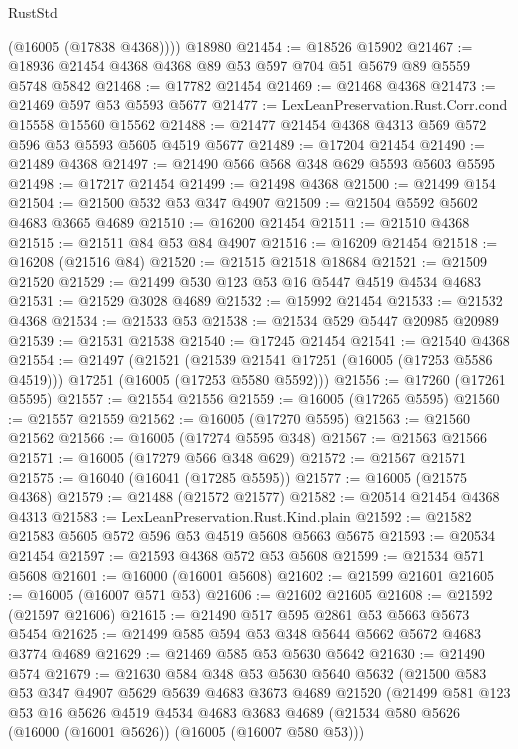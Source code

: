 \begin{lexlean}{RustStd}
\begin{coremodule}
        (@16005 (@17838 @4368))))
    @18980
@21454 := @18526 @15902
@21467 := @18936 @21454 @4368 @4368 @89 @53 @597 @704 @51 @5679 @89 @5559 @5748 @5842
@21468 := @17782 @21454
@21469 := @21468 @4368
@21473 := @21469 @597 @53 @5593 @5677
@21477 := LexLeanPreservation.Rust.Corr.cond @15558 @15560 @15562
@21488 := @21477 @21454 @4368 @4313 @569 @572 @596 @53 @5593 @5605 @4519 @5677
@21489 := @17204 @21454
@21490 := @21489 @4368
@21497 := @21490 @566 @568 @348 @629 @5593 @5603 @5595
@21498 := @17217 @21454
@21499 := @21498 @4368
@21500 := @21499 @154
@21504 := @21500 @532 @53 @347 @4907
@21509 := @21504 @5592 @5602 @4683 @3665 @4689
@21510 := @16200 @21454
@21511 := @21510 @4368
@21515 := @21511 @84 @53 @84 @4907
@21516 := @16209 @21454
@21518 := @16208 (@21516 @84)
@21520 := @21515 @21518 @18684
@21521 := @21509 @21520
@21529 := @21499 @530 @123 @53 @16 @5447 @4519 @4534 @4683
@21531 := @21529 @3028 @4689
@21532 := @15992 @21454
@21533 := @21532 @4368
@21534 := @21533 @53
@21538 := @21534 @529 @5447 @20985 @20989
@21539 := @21531 @21538
@21540 := @17245 @21454
@21541 := @21540 @4368
@21554 := @21497
    (@21521
      (@21539 @21541 @17251 (@16005 (@17253 @5586 @4519)))
      @17251
      (@16005 (@17253 @5580 @5592)))
@21556 := @17260 (@17261 @5595)
@21557 := @21554 @21556
@21559 := @16005 (@17265 @5595)
@21560 := @21557 @21559
@21562 := @16005 (@17270 @5595)
@21563 := @21560 @21562
@21566 := @16005 (@17274 @5595 @348)
@21567 := @21563 @21566
@21571 := @16005 (@17279 @566 @348 @629)
@21572 := @21567 @21571
@21575 := @16040 (@16041 (@17285 @5595))
@21577 := @16005 (@21575 @4368)
@21579 := @21488 (@21572 @21577)
@21582 := @20514 @21454 @4368 @4313
@21583 := LexLeanPreservation.Rust.Kind.plain
@21592 := @21582 @21583 @5605 @572 @596 @53 @4519 @5608 @5663 @5675
@21593 := @20534 @21454
@21597 := @21593 @4368 @572 @53 @5608
@21599 := @21534 @571 @5608
@21601 := @16000 (@16001 @5608)
@21602 := @21599 @21601
@21605 := @16005 (@16007 @571 @53)
@21606 := @21602 @21605
@21608 := @21592 (@21597 @21606)
@21615 := @21490 @517 @595 @2861 @53 @5663 @5673 @5454
@21625 := @21499 @585 @594 @53 @348 @5644 @5662 @5672 @4683 @3774 @4689
@21629 := @21469 @585 @53 @5630 @5642
@21630 := @21490 @574
@21679 := @21630
    @584
    @348
    @53
    @5630
    @5640
    @5632
    (@21500
      @583
      @53
      @347
      @4907
      @5629
      @5639
      @4683
      @3673
      @4689
      @21520
      (@21499
        @581
        @123
        @53
        @16
        @5626
        @4519
        @4534
        @4683
        @3683
        @4689
        (@21534 @580 @5626 (@16000 (@16001 @5626)) (@16005 (@16007 @580 @53)))

\end{coremodule}
\end{lexlean}
